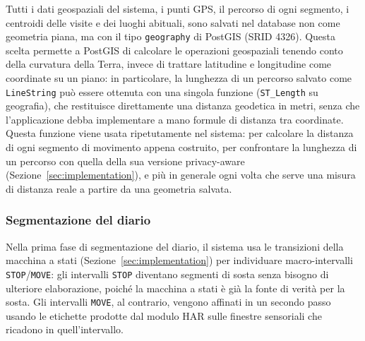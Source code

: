 \documentclass[conference]{IEEEtran}
\begin{document}
Tutti i dati geospaziali del sistema, i punti GPS, il percorso di
ogni segmento, i centroidi delle visite e dei luoghi abituali, sono
salvati nel database non come geometria piana, ma con il tipo
\texttt{geography} di PostGIS (SRID 4326). Questa
scelta permette a PostGIS di calcolare le operazioni geospaziali
tenendo conto della curvatura della Terra, invece di trattare
latitudine e longitudine come coordinate su un piano: in particolare,
la lunghezza di un percorso salvato come \texttt{LineString} può
essere ottenuta con una singola funzione (\texttt{ST\_Length} su
geografia), che restituisce direttamente una distanza geodetica in
metri, senza che l'applicazione debba implementare a mano formule di
distanza tra coordinate. Questa funzione viene usata ripetutamente nel
sistema: per calcolare la distanza di ogni segmento di movimento
appena costruito, per confrontare la lunghezza di un percorso con
quella della sua versione privacy-aware (Sezione~\ref{sec:implementation}),
e più in generale ogni volta che serve una misura di distanza reale a
partire da una geometria salvata.

\subsubsection{Segmentazione del diario}

Nella prima fase di segmentazione del diario, il sistema usa le
transizioni della macchina a stati (Sezione~\ref{sec:implementation})
per individuare macro-intervalli \texttt{STOP}/\texttt{MOVE}: gli
intervalli \texttt{STOP} diventano segmenti di sosta senza bisogno di
ulteriore elaborazione, poiché la macchina a stati è già la fonte di
verità per la sosta. Gli intervalli \texttt{MOVE}, al contrario,
vengono affinati in un secondo passo usando le etichette prodotte dal
modulo HAR sulle finestre sensoriali che ricadono in quell'intervallo.
\end{document}
